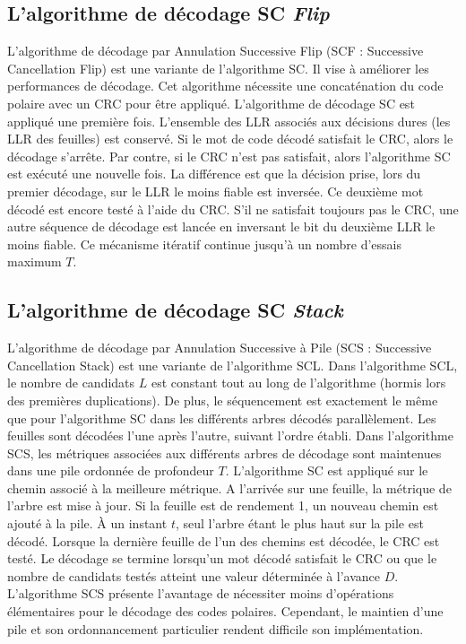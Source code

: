 \subsection{L'algorithme de décodage SC \textit{Flip}}

	L'algorithme de décodage par Annulation Successive \og Flip \fg (SCF : Successive Cancellation Flip) \cite{afisiadis_low-complexity_2014} est une variante de l'algorithme SC. Il vise à améliorer les performances de décodage. Cet algorithme nécessite une concaténation du code polaire avec un CRC pour être appliqué. L'algorithme de décodage SC est appliqué une première fois. L'ensemble des LLR associés aux décisions dures (les LLR des feuilles) est conservé. Si le mot de code décodé satisfait le CRC, alors le décodage s'arrête. Par contre, si le CRC n'est pas satisfait, alors l'algorithme SC est exécuté une nouvelle fois. La différence est que la décision prise, lors du premier décodage, sur le LLR le moins fiable est inversée. Ce deuxième mot décodé est encore testé à l'aide du CRC. S'il ne satisfait toujours pas le CRC, une autre séquence de décodage est lancée en inversant le bit du deuxième LLR le moins fiable. Ce mécanisme itératif continue jusqu'à un nombre d'essais maximum $T$.


	\subsection{L'algorithme de décodage SC \textit{Stack}}
	L'algorithme de décodage par Annulation Successive à Pile (SCS : Successive Cancellation Stack) \cite{niu_stack_2012} est une variante de l'algorithme SCL. Dans l'algorithme SCL, le nombre de candidats $L$ est constant tout au long de l'algorithme (hormis lors des premières duplications). De plus, le séquencement est exactement le même que pour l'algorithme SC dans les différents arbres décodés parallèlement. Les feuilles sont décodées l'une après l'autre, suivant l'ordre établi. Dans l'algorithme SCS, les métriques associées aux différents arbres de décodage sont maintenues dans une pile ordonnée de profondeur $T$. L'algorithme SC est appliqué sur le chemin associé à la meilleure métrique. A l'arrivée sur une feuille, la métrique de l'arbre est mise à jour. Si la feuille est de rendement 1, un nouveau chemin est ajouté à la pile. \`A un instant $t$, seul l'arbre étant le plus haut sur la pile est décodé. Lorsque la dernière feuille de l'un des chemins est décodée, le CRC est testé. Le décodage se termine lorsqu'un mot décodé satisfait le CRC ou que le nombre de candidats testés atteint une valeur déterminée à l'avance $D$. L'algorithme SCS présente l'avantage de nécessiter moins d'opérations élémentaires pour le décodage des codes polaires. Cependant, le maintien d'une pile et son ordonnancement particulier rendent difficile son implémentation.

